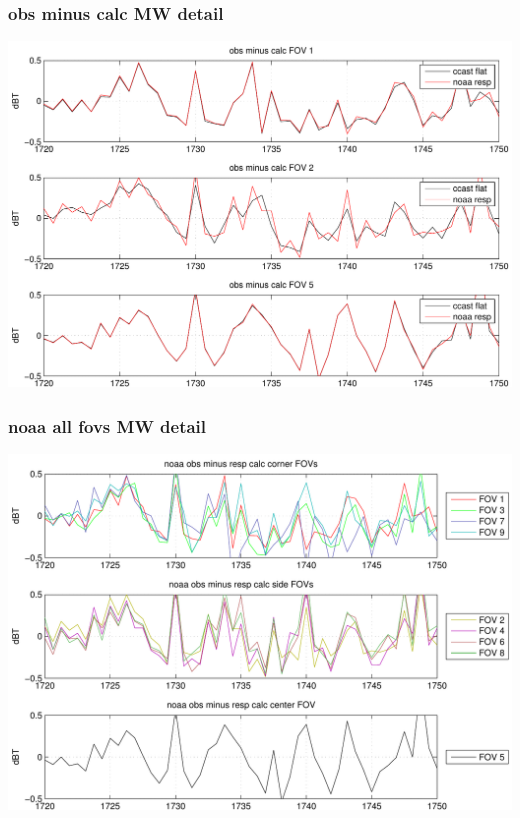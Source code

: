 \documentclass[11pt]{beamer}
\begin{document}
\begin{frame}
\frametitle{obs minus calc MW detail}
\begin{center}
  \includegraphics[scale=0.5]{figures/cal_MW_detail.pdf}
\end{center}
\end{frame}
\begin{frame}
\frametitle{noaa all fovs MW detail}
\begin{center}
  \includegraphics[scale=0.5]{figures/cal_noaa_MW.pdf}
\end{center}
\end{frame}
\end{document}
